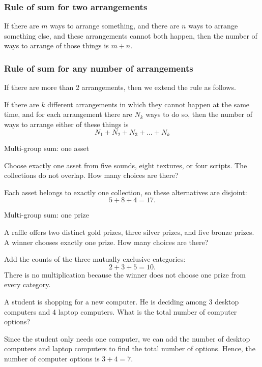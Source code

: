 \begin{frame}
\frametitle{Rule of sum for two arrangements}
\begin{thm}{}{}
If there are $m$ ways to arrange something, and there are $n$ ways to arrange something else, and these arrangements cannot both happen, then the number of ways to arrange  of those things is $m + n$.
\end{thm}
\end{frame}

\begin{frame}
\frametitle{Rule of sum for any number of arrangements}
If there are more than 2 arrangements, then we extend the rule as follows.
\begin{thm}{}{}
If there are $k$ different arrangements in which they cannot happen at the same time, and for each arrangement there are $N_k$ ways to do so, then the number of ways to arrange either of these things is
\begin{equation} \label{eq:rule_of_addition}
N_1 + N_2 + N_3 + \ldots + N_k
\end{equation}
\end{thm}
\end{frame}
\begin{frame}[t]{Multi-group sum: one asset}
\small
\begin{ex}
Choose exactly one asset from five sounds, eight textures, or four scripts. The collections do not overlap. How many choices are there?
\end{ex}
\begin{sol}
Each asset belongs to exactly one collection, so these alternatives are disjoint:\[5+8+4=17.\]
\end{sol}
\end{frame}

\begin{frame}[t]{Multi-group sum: one prize}
\small
\begin{ex}
A raffle offers two distinct gold prizes, three silver prizes, and five bronze prizes. A winner chooses exactly one prize. How many choices are there?
\end{ex}
\begin{sol}
Add the counts of the three mutually exclusive categories:\[2+3+5=10.\] There is no multiplication because the winner does not choose one prize from every category.
\end{sol}
\end{frame}



\begin{frame}[t]
\begin{ex}
A student is shopping for a new computer. He is deciding among 3 desktop computers and 4 laptop computers. What is the total number of computer options?
\end{ex}
\begin{sol}
Since the student only needs one computer, we can add the number of desktop computers and laptop computers to find the total number of options. \pa Hence, the number of computer options is $3 + 4 = 7$.
\end{sol}
\end{frame}



